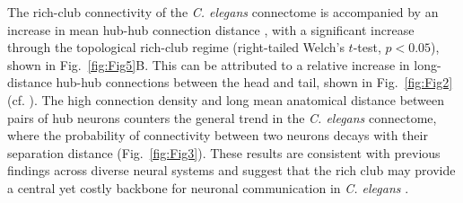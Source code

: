 \documentclass[10pt,letterpaper]{article}
\begin{document}
The rich-club connectivity of the \emph{C. elegans} connectome is accompanied by an increase in mean hub-hub connection distance \cite{Towlson2013}, with a significant increase through the topological rich-club regime (right-tailed Welch's $t$-test, $p < 0.05$), shown in Fig.~\ref{fig:Fig5}B.
This can be attributed to a relative increase in long-distance hub-hub connections between the head and tail, shown in Fig.~\ref{fig:Fig2} (cf. ).
The high connection density and long mean anatomical distance between pairs of hub neurons counters the general trend in the \emph{C. elegans} connectome, where the probability of connectivity between two neurons decays with their separation distance (Fig.~\ref{fig:Fig3}).
These results are consistent with previous findings across diverse neural systems and suggest that the rich club may provide a central yet costly backbone for neuronal communication in \emph{C. elegans} \cite{vandenHeuvel:2012kh, Towlson2013}.

\end{document}
